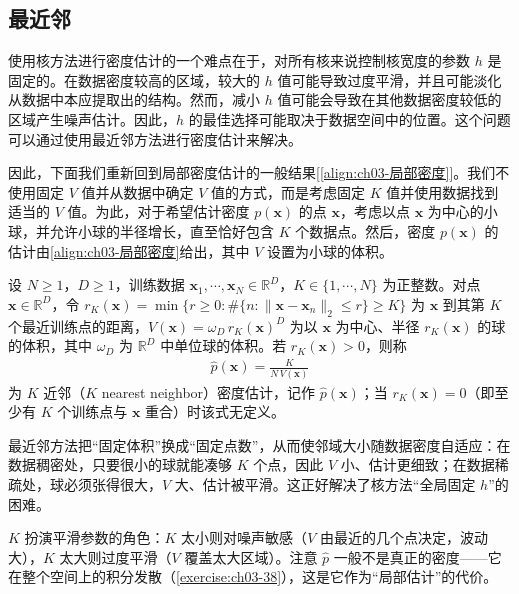 \documentclass[../../main.tex]{subfiles}
\begin{document}
\subsection{最近邻}\label{subsection:ch03-最近邻}

使用核方法进行密度估计的一个难点在于，对所有核来说控制核宽度的参数 $h$ 是固定的。在数据密度较高的区域，较大的 $h$ 值可能导致过度平滑，并且可能淡化从数据中本应提取出的结构。然而，减小 $h$ 值可能会导致在其他数据密度较低的区域产生噪声估计。因此，$h$ 的最佳选择可能取决于数据空间中的位置。这个问题可以通过使用最近邻方法进行密度估计来解决。

因此，下面我们重新回到局部密度估计的一般结果[\eqref{align:ch03-局部密度}]。我们不使用固定 $V$ 值并从数据中确定 $V$ 值的方式，而是考虑固定 $K$ 值并使用数据找到适当的 $V$ 值。为此，对于希望估计密度 $p(\boldsymbol{x})$ 的点 $\boldsymbol{x}$，考虑以点 $\boldsymbol{x}$ 为中心的小球，并允许小球的半径增长，直至恰好包含 $K$ 个数据点。然后，密度 $p(\boldsymbol{x})$ 的估计由\eqref{align:ch03-局部密度}给出，其中 $V$ 设置为小球的体积。

\begin{definition}[$K$ 近邻密度估计]\label{definition:ch03-近邻密度}
设 $N\geqslant1$，$D\geqslant1$，训练数据 $\boldsymbol{x}_1,\cdots,\boldsymbol{x}_N\in\mathbb{R}^{D}$，$K\in\{1,\cdots,N\}$ 为正整数。对点 $\boldsymbol{x}\in\mathbb{R}^{D}$，令 $r_K(\boldsymbol{x})=\min\{r\geqslant0:\#\{n:\lVert\boldsymbol{x}-\boldsymbol{x}_n\rVert_{2}\leqslant r\}\geqslant K\}$ 为 $\boldsymbol{x}$ 到其第 $K$ 个最近训练点的距离，$V(\boldsymbol{x})=\omega_D\,r_K(\boldsymbol{x})^{D}$ 为以 $\boldsymbol{x}$ 为中心、半径 $r_K(\boldsymbol{x})$ 的球的体积，其中 $\omega_D$ 为 $\mathbb{R}^{D}$ 中单位球的体积。若 $r_K(\boldsymbol{x})>0$，则称
\begin{align*}
\hat{p}(\boldsymbol{x})=\frac{K}{N\,V(\boldsymbol{x})}
\end{align*}
为 $K$ 近邻（$K$ nearest neighbor）密度估计，记作 $\hat{p}(\boldsymbol{x})$；当 $r_K(\boldsymbol{x})=0$（即至少有 $K$ 个训练点与 $\boldsymbol{x}$ 重合）时该式无定义。
\end{definition}

\begin{remark}
最近邻方法把“固定体积”换成“固定点数”，从而使邻域大小随数据密度自适应：在数据稠密处，只要很小的球就能凑够 $K$ 个点，因此 $V$ 小、估计更细致；在数据稀疏处，球必须张得很大，$V$ 大、估计被平滑。这正好解决了核方法“全局固定 $h$”的困难。

$K$ 扮演平滑参数的角色：$K$ 太小则对噪声敏感（$V$ 由最近的几个点决定，波动大），$K$ 太大则过度平滑（$V$ 覆盖太大区域）。注意 $\hat{p}$ 一般不是真正的密度——它在整个空间上的积分发散（\cref{exercise:ch03-38}），这是它作为“局部估计”的代价。
\end{remark}
\end{document}
